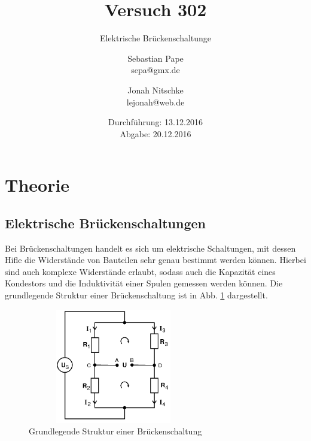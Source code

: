 

\title{Versuch 302}
\subtitle{Elektrische Brückenschaltunge}
\author{Sebastian Pape\\
        sepa@gmx.de \and
        Jonah Nitschke\\
        lejonah@web.de}
\date{Durchführung: 13.12.2016\\
      Abgabe: 20.12.2016}


\maketitle
\setcounter{page}{1}
\section{Theorie}

\subsection{Elektrische Brückenschaltungen}

Bei Brückenschaltungen handelt es sich um elektrische Schaltungen, mit dessen
Hifle die Widerstände von Bauteilen sehr genau bestimmt werden können.
Hierbei sind auch komplexe Widerstände erlaubt, sodass auch die Kapazität eines
Kondestors und die Induktivität einer Spulen gemessen werden können.
Die grundlegende Struktur einer Brückenschaltung ist in Abb. \ref{fig:Brückenschaltung}
dargestellt.

\begin{figure}
  \includegraphics[width=7.50cm, height=5cm]{V302_Brückenschaltung.png}
  \caption{Grundlegende Struktur einer Brückenschaltung}
  \label{fig:Brückenschaltung}
\end{figure}

